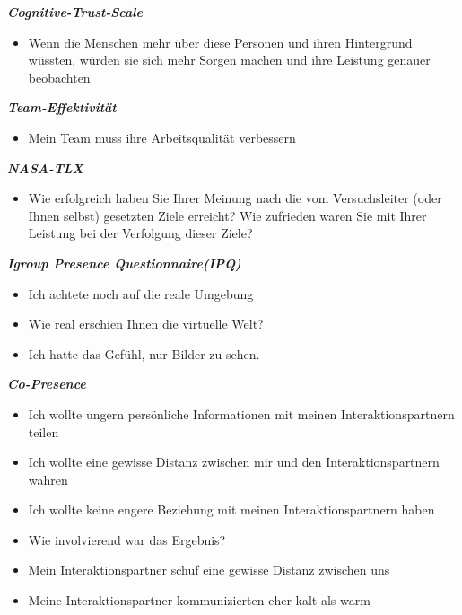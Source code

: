 \documentclass[a4paper,11pt]{article}%
\renewcommand{\\}{\vspace*{0.5\baselineskip} \newline}
\begin{document}
\textbf{\textit{Cognitive-Trust-Scale}}
\begin{itemize}
	\item Wenn die Menschen mehr über diese Personen und ihren Hintergrund wüssten, würden sie sich mehr Sorgen machen und ihre Leistung genauer beobachten
\end{itemize}

\textbf{\textit{Team-Effektivität}}
\begin{itemize}
	\item Mein Team muss ihre Arbeitsqualität verbessern
\end{itemize}

\textbf{\textit{NASA-TLX}}
\begin{itemize}
	\item Wie erfolgreich haben Sie Ihrer Meinung nach die vom Versuchsleiter (oder Ihnen selbst) gesetzten Ziele erreicht? Wie zufrieden waren Sie mit Ihrer Leistung bei der Verfolgung dieser Ziele? 
\end{itemize}

\textbf{\textit{Igroup Presence Questionnaire(IPQ)}}
\begin{itemize}
	\item Ich achtete noch auf die reale Umgebung
	\item Wie real erschien Ihnen die virtuelle Welt?
	\item Ich hatte das Gefühl, nur Bilder zu sehen. 
\end{itemize}

\textbf{\textit{Co-Presence}}
\begin{itemize}
	\item Ich wollte ungern persönliche Informationen mit meinen Interaktionspartnern teilen
	\item Ich wollte eine gewisse Distanz zwischen mir und den Interaktionspartnern wahren
	\item Ich wollte keine engere Beziehung mit meinen Interaktionspartnern haben
	\item Wie involvierend war das Ergebnis?
	\item Mein Interaktionspartner schuf eine gewisse Distanz zwischen uns
	\item Meine Interaktionspartner kommunizierten eher \dq{}kalt\dq{} als \dq{}warm \dq{}
\end{itemize}
\end{document}
